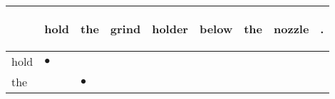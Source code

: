 \documentclass[landscape]{article}
\newcommand{\ssp}{\hspace{2pt}}
\newcommand{\mex}{\cellcolor{g}$\bullet$}
\begin{document}
\noindent\begin{tabular}{|l|p{10pt}|p{10pt}|p{10pt}|p{10pt}|p{10pt}|p{10pt}|p{10pt}|p{10pt}|}
\hline
&\begin{sideways}\cellcolor{ref0}hold\hspace{12pt}\end{sideways}&\begin{sideways}\cellcolor{ref1}the\hspace{12pt}\end{sideways}&\begin{sideways}\cellcolor{ref2}grind\hspace{12pt}\end{sideways}&\begin{sideways}\cellcolor{ref3}holder\hspace{12pt}\end{sideways}&\begin{sideways}\cellcolor{ref4}below\hspace{12pt}\end{sideways}&\begin{sideways}\cellcolor{ref5}the\hspace{12pt}\end{sideways}&\begin{sideways}\cellcolor{ref6}nozzle\hspace{12pt}\end{sideways}&\begin{sideways}\cellcolor{ref7}.\hspace{12pt}\end{sideways}\\
\hline
\ssp \cellcolor{ref0}hold \ssp&\hspace{2pt}\mex&\hspace{2pt}&\hspace{2pt}&\hspace{2pt}&\hspace{2pt}&\hspace{2pt}&\hspace{2pt}&\hspace{2pt}\\
\hline
\ssp \cellcolor{ref1}the \ssp&\hspace{2pt}&\hspace{2pt}\mex&\hspace{2pt}&\hspace{2pt}&\hspace{2pt}&\hspace{2pt}&\hspace{2pt}&\hspace{2pt}\\

\end{tabular}
\end{document}
